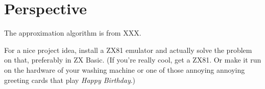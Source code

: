\documentclass{tufte-handout}
\begin{document}
\newpage
\section{Perspective}

The approximation algorithm is from XXX.

For a nice project idea, install a ZX81 emulator and actually solve
the problem on that, preferably in ZX Basic.
(If you're really cool, get a ZX81.
Or make it run on the hardware of your washing machine or one of those
annoying annoying greeting cards that play \emph{Happy Birthday}.)
\end{document}
